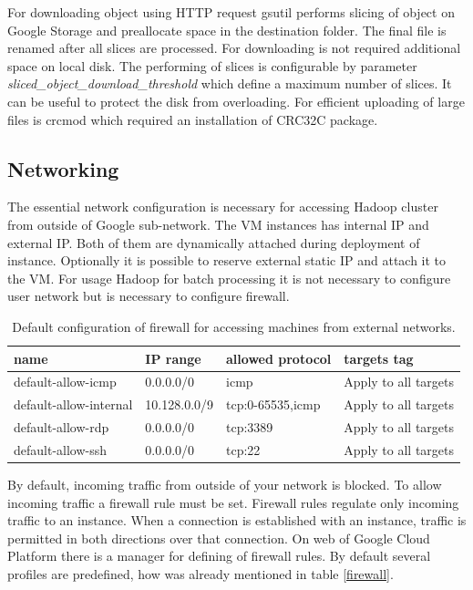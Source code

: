 \documentclass[a4paper,12pt,oneside]{report}
\begin{document}
	For downloading object using HTTP request gsutil performs slicing of object on
	Google Storage  and preallocate space in the destination folder. 
	The final file is renamed after all slices are	processed. For downloading 
	is not required additional space on local disk. The performing of slices is configurable by parameter
	\textit{sliced\_object\_download\_threshold} which 	define a maximum number of slices. It can be 
	useful to protect the disk from overloading. For efficient uploading of large
	files is crcmod which required 	an installation  of CRC32C package. 
	
	\subsection{Networking}
	The essential network configuration is necessary  for accessing Hadoop cluster
	from outside of Google sub-network. The VM instances has internal IP and
	external IP. Both of them are dynamically attached during deployment of
	instance. Optionally it is possible to reserve external static IP and attach it to
	the VM.  For usage Hadoop for batch processing it is not necessary to configure
	user network but is necessary to configure firewall. 
	
	\begin{table}[!htbp]
		\centering
		\begin{scriptsize}
			\begin{tabular}{@{}|l|l|l|l|@{}}
				\toprule
				name                   & IP range     & allowed protocol & targets tag         
				\\ \midrule  \midrule
				default-allow-icmp     & 0.0.0.0/0    & icmp             & Apply to all targets
				\\ \midrule
				default-allow-internal & 10.128.0.0/9 & tcp:0-65535,icmp & Apply to all targets
				\\ \midrule
				default-allow-rdp      & 0.0.0.0/0    & tcp:3389         & Apply to all targets
				\\ \midrule
				default-allow-ssh      & 0.0.0.0/0    & tcp:22           & Apply to all targets
				\\ \bottomrule
			\end{tabular}
		\end{scriptsize}
		\caption{Default configuration of firewall for accessing machines from external networks.}
		\label{my-label}
	\end{table}
	By default, incoming traffic from outside of your network is blocked. To allow
	incoming traffic a firewall rule must be set. Firewall rules regulate only incoming
	traffic to an instance. When a connection is established with an instance,
	traffic is permitted in both directions over that connection. On web of Google
	Cloud Platform there is a manager for defining of firewall rules. By default several
	profiles are predefined, how was already mentioned in table \ref{firewall}.
	
\end{document}
